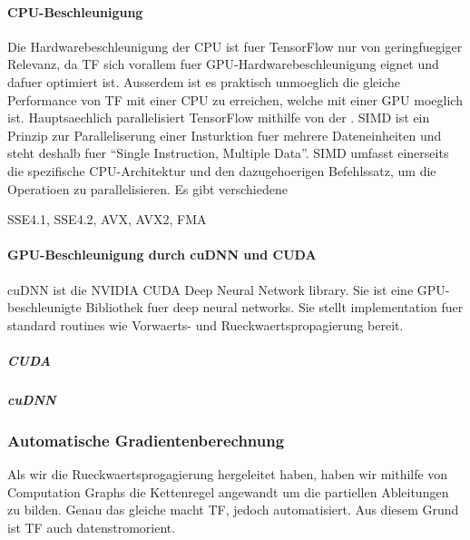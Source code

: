 \paragraph{CPU-Beschleunigung}
Die Hardwarebeschleunigung der CPU ist fuer TensorFlow nur von geringfuegiger
Relevanz, da TF sich vorallem fuer GPU-Hardwarebeschleunigung eignet
und dafuer optimiert ist. Ausserdem ist es praktisch unmoeglich die gleiche
Performance von TF mit einer CPU zu erreichen, welche mit einer GPU moeglich ist.
\para{}
Hauptsaechlich parallelisiert TensorFlow mithilfe von der . SIMD
ist ein Prinzip zur Paralleliserung einer Insturktion fuer mehrere
Dateneinheiten und steht deshalb fuer ``Single Instruction, Multiple Data''.
SIMD umfasst einerseits die spezifische CPU-Architektur und den dazugehoerigen
Befehlssatz, um die Operatioen zu parallelisieren.
Es gibt verschiedene

SSE4.1, SSE4.2, AVX, AVX2, FMA

\paragraph{GPU-Beschleunigung durch cuDNN und CUDA}
cuDNN ist die NVIDIA CUDA Deep Neural Network library. Sie ist eine
GPU-beschleunigte Bibliothek fuer deep neural networks. Sie stellt
implementation fuer standard routines wie Vorwaerts- und Rueckwaertspropagierung bereit.

\subparagraph{CUDA}
\subparagraph{cuDNN}


\subsubsection{Automatische Gradientenberechnung}
Als wir die Rueckwaertsprogagierung hergeleitet haben, haben wir mithilfe von
Computation Graphs die Kettenregel angewandt um die partiellen Ableitungen zu
bilden. Genau das gleiche macht TF, jedoch automatisiert. Aus diesem Grund ist
TF auch datenstromorient.




